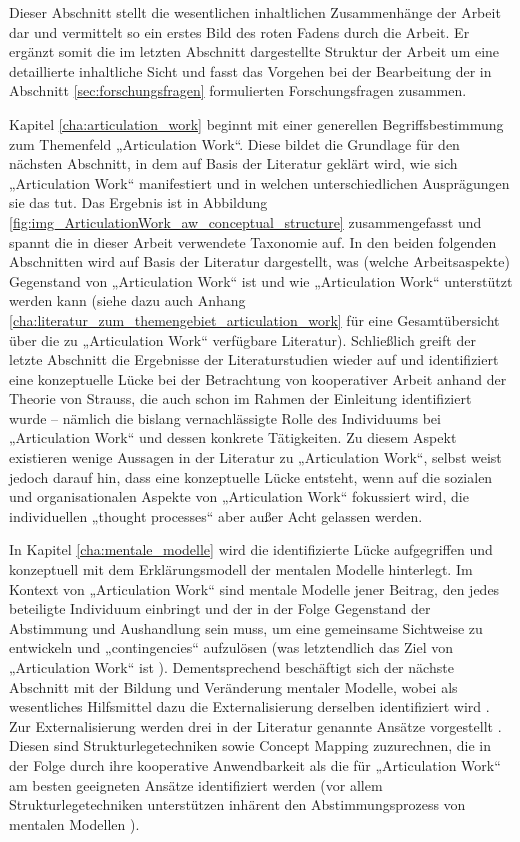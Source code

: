 Dieser Abschnitt stellt die wesentlichen inhaltlichen Zusammenhänge der Arbeit dar und vermittelt so ein erstes Bild des roten Fadens durch die Arbeit. Er ergänzt somit die im letzten Abschnitt dargestellte Struktur der Arbeit um eine detaillierte inhaltliche Sicht und fasst das Vorgehen bei der Bearbeitung der in Abschnitt \ref{sec:forschungsfragen} formulierten Forschungsfragen zusammen.

Kapitel \ref{cha:articulation_work} beginnt mit einer generellen Begriffsbestimmung zum Themenfeld „Articulation Work“. Diese bildet die Grundlage für den nächsten Abschnitt, in dem auf Basis der Literatur geklärt wird, wie sich „Articulation Work“ manifestiert und in welchen unterschiedlichen Ausprägungen sie das tut. Das Ergebnis ist in Abbildung \ref{fig:img_ArticulationWork_aw_conceptual_structure} zusammengefasst und spannt die in dieser Arbeit verwendete Taxonomie auf. In den beiden folgenden Abschnitten wird auf Basis der Literatur dargestellt, was (welche Arbeitsaspekte) Gegenstand von „Articulation Work“ ist und wie „Articulation Work“ unterstützt werden kann (siehe dazu auch Anhang \ref{cha:literatur_zum_themengebiet_articulation_work} für eine Gesamtübersicht über die zu „Articulation Work“ verfügbare Literatur). Schließlich greift der letzte Abschnitt die Ergebnisse der Literaturstudien wieder auf und identifiziert eine konzeptuelle Lücke bei der Betrachtung von kooperativer Arbeit anhand der Theorie von Strauss, die auch schon im Rahmen der Einleitung identifiziert wurde  -- nämlich die bislang vernachlässigte Rolle des Individuums bei „Articulation Work“ und dessen konkrete Tätigkeiten. Zu diesem Aspekt existieren wenige Aussagen in der Literatur zu „Articulation Work“, \citet{Strauss93} selbst weist jedoch darauf hin, dass eine konzeptuelle Lücke entsteht, wenn auf die sozialen und organisationalen Aspekte von „Articulation Work“ fokussiert wird, die individuellen „thought processes“ aber außer Acht gelassen werden.

In Kapitel \ref{cha:mentale_modelle} wird die identifizierte Lücke aufgegriffen und konzeptuell mit dem Erklärungsmodell der mentalen Modelle \citep{Johnson-Laird81} hinterlegt. Im Kontext von „Articulation Work“ sind mentale Modelle jener Beitrag, den jedes beteiligte Individuum einbringt und der in der Folge Gegenstand der Abstimmung und Aushandlung sein muss, um eine gemeinsame Sichtweise zu entwickeln und „contingencies“ aufzulösen (was letztendlich das Ziel von „Articulation Work“ ist \citep{Gerson86}). Dementsprechend beschäftigt sich der nächste Abschnitt mit der Bildung und Veränderung mentaler Modelle, wobei als wesentliches Hilfsmittel dazu die Externalisierung derselben identifiziert wird \citep{Seel91}. Zur Externalisierung werden drei in der Literatur genannte Ansätze vorgestellt \citep{Ifenthaler06}. Diesen sind Strukturlegetechniken \citep{Dann92} sowie Concept Mapping \citep{Novak06} zuzurechnen, die in der Folge durch ihre kooperative Anwendbarkeit als die für „Articulation Work“ am besten geeigneten Ansätze identifiziert werden (vor allem Strukturlegetechniken unterstützen inhärent den Abstimmungsprozess von mentalen Modellen \citep{Groeben00}).

